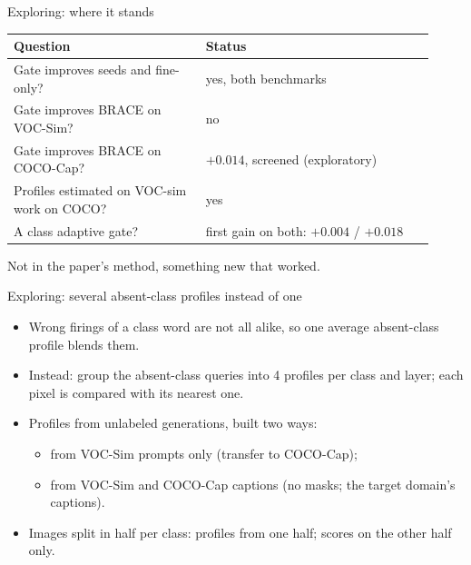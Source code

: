 \documentclass[aspectratio=169,11pt]{beamer}
\newenvironment{slidetable}{\begin{center}\small\renewcommand{\arraystretch}{1.12}}{\end{center}}
\begin{document}
\begin{frame}{Exploring: where it stands}
\begin{slidetable}
\begin{tabular}{@{}L{0.42\linewidth}L{0.50\linewidth}@{}}
\toprule
Question & Status \\
\midrule
Gate improves seeds and fine-only? & yes, both benchmarks \\
Gate improves BRACE on VOC-Sim? & no \\
Gate improves BRACE on COCO-Cap? & $+0.014$, screened (exploratory) \\
Profiles estimated on VOC-sim work on COCO? & yes \\
A class adaptive gate? & first gain on both: $+0.004$ / $+0.018$ \\
\bottomrule
\end{tabular}
\end{slidetable}
Not in the paper's method, something new that worked. 

\end{frame}

\begin{frame}{Exploring: several absent-class profiles instead of one}
\begin{itemize}
\item Wrong firings of a class word are not all alike, so one average absent-class profile blends them.
\item Instead: group the absent-class queries into 4 profiles per class and layer; each pixel is compared with its nearest one.
\item Profiles from unlabeled generations, built two ways:
  \begin{itemize}
  \item from VOC-Sim prompts only (transfer to COCO-Cap);
  \item from VOC-Sim and COCO-Cap captions (no masks; the target domain's captions).
  \end{itemize}
\item Images split in half per class: profiles from one half; scores on the other half only.
\end{itemize}
\end{frame}
\end{document}
